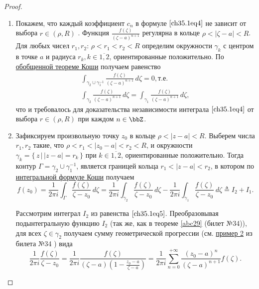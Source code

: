 \begin{proof}\leavevmode

\begin{enumerate}[wide, labelwidth=!, labelindent=\parindent]
\item
Покажем, что каждый коэффициент $c_n$ в формуле $\eqref{ch35.1eq4}$ не зависит от выбора $r \in (\rho, R)$ . Функция $\frac{f(\zeta)}{(\zeta - a)^{n+1}}$ регулярна в кольце $\rho < |\zeta - a| < R$. Для любых чисел $r_1, r_2$: $\rho < r_1 < r_2 < R$ определим окружности $\gamma_k$ с центром в точке $a$ и радиуса $r_k, k \in \overline{1,2}$, ориентированные положительно. По \hyperref[abc28]{обобщенной теореме Коши} получаем равенство
\begin{equation*}
\begin{split}
\int_{\gamma_2 \cup \gamma_{1}^{-1}} \frac{f(\zeta)}{(\zeta - a)^{n + 1}} \,d\zeta = 0, \text{т.е.}\\
\int_{\gamma_2} \frac{f(\zeta)}{(\zeta - a)^{n + 1}} \,d\zeta = \int_{\gamma_1} \frac{f(\zeta)}{(\zeta - a)^{n + 1}} \,d\zeta,
\end{split}
\end{equation*}
что и требовалось для доказательства независимости интеграла $\eqref{ch35.1eq4}$ от выбора $r \in (\rho, R)$ при каждом $n \in \bbZ$.

\item
Зафиксируем произвольную точку $z_0$ в кольце $\rho < |z - a| < R$. Выберем числа $r_1, r_2$ такие, что 
$\rho < r_1 < |z_0 - a| < r_2 < R$, и окружности $\gamma_k = \{\, z \,\big|\, |z - a| = r_k\,\}$ при $k \in \overline{1,2}$, ориентированные положительно. Тогда контур $\Gamma = \gamma_2 \cup \gamma_{1}^{-1}$, является границей кольца $r_1 < |z - a| < r_2$, в котором по  \hyperref[ch34thm1]{интегральной формуле Коши} получаем
\begin{equation} \label{ch35.1eq5}
f(z_0) = \frac{1}{2\pi i} \int_\Gamma \frac{f(\zeta)}{\zeta - z_0} \,d\zeta = \frac{1}{2\pi i} \int_{\gamma_2} \frac{f(\zeta)}{\zeta - z_0} \,d\zeta - \frac{1}{2\pi i} \int_{\gamma_1} \frac{f(\zeta)}{\zeta - z_0} \,d\zeta \triangleq I_2 + I_1.
\end{equation}

Рассмотрим интеграл $I_2$ из равенства $\eqref{ch35.1eq5}$. Преобразовывая подынтегральную функцию $I_2$ (так же, как в теореме \ref{abc29} (билет №34)), для всех $\zeta \in \gamma_2$ получаем сумму геометрической прогрессии (см. \hyperref[exmpl2]{пример 2} из билета №34 ) вида
\begin{equation} \label{ch35.1eq6}
\frac{1}{2\pi i} \frac{f(\zeta)}{\zeta - z_0} = \frac{1}{2\pi i} \frac{f(\zeta)}{(\zeta - a) \left( 1 - \frac{z_0 - a}{\zeta - a}\right)} = \frac{1}{2\pi i}\sum\limits_{n = 0}^{+\infty} \frac{(z_0 - a)^n}{(\zeta - a)^{n + 1}} f(\zeta).
\end{equation}


\end{enumerate}
\end{proof}

